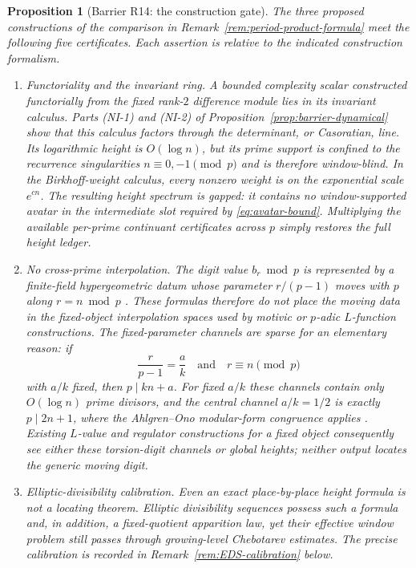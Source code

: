 \documentclass[11pt]{amsart}
\theoremstyle{plain}
\newtheorem{proposition}{Proposition}
\theoremstyle{remark}
\begin{document}
\begin{proposition}[Barrier R14: the construction gate]
\label{prop:barrier-construction}
The three proposed constructions of the comparison in
Remark~\ref{rem:period-product-formula} meet the following five
certificates.  Each assertion is relative to the indicated
construction formalism.
\begin{enumerate}
\item \emph{Functoriality and the invariant ring.}  A bounded complexity
scalar constructed functorially from the fixed rank-$2$ difference
module lies in its invariant calculus.  Parts (NI-1) and (NI-2) of
Proposition~\ref{prop:barrier-dynamical} show that this calculus
factors through the determinant, or Casoratian, line.  Its
logarithmic height is $O(\log n)$, but its prime support is confined to
the recurrence singularities $n\equiv0,-1\pmod p$ and is therefore
window-blind.  In the Birkhoff-weight calculus, every nonzero weight is
on the exponential scale $e^{c n}$.  The resulting height spectrum is
gapped: it contains no window-supported avatar in the intermediate
slot required by \eqref{eq:avatar-bound}.  Multiplying the available
per-prime continuant certificates across $p$ simply restores the full
height ledger.

\item \emph{No cross-prime interpolation.}  The digit value
$b_r\bmod p$ is represented by a finite-field hypergeometric datum
whose parameter $r/(p-1)$ moves with $p$ along $r=n\bmod p$
\cite{KalitaChetry2017}.  These formulas therefore do not place the
moving data in the fixed-object interpolation spaces used by motivic
or $p$-adic $L$-function constructions.
The fixed-parameter channels are sparse for an elementary reason: if
\[
 \frac{r}{p-1}=\frac ak
 \quad\text{and}\quad r\equiv n\pmod p
\]
with $a/k$ fixed, then $p\mid kn+a$.  For fixed $a/k$ these channels
contain only $O(\log n)$ prime divisors, and the central channel
$a/k=1/2$ is exactly $p\mid2n+1$, where the Ahlgren--Ono modular-form
congruence applies \cite{AhlgrenOno2000}.  Existing $L$-value and
regulator constructions for a fixed object consequently see either
these torsion-digit channels or global heights; neither output locates
the generic moving digit.

\item \emph{Elliptic-divisibility calibration.}  Even an exact
place-by-place height formula is not a locating theorem.  Elliptic
divisibility sequences possess such a formula and, in addition, a
fixed-quotient apparition law, yet their effective window problem
still passes through growing-level Chebotarev estimates.  The precise
calibration is recorded in Remark~\ref{rem:EDS-calibration} below.


\end{enumerate}
\end{proposition}
\end{document}
